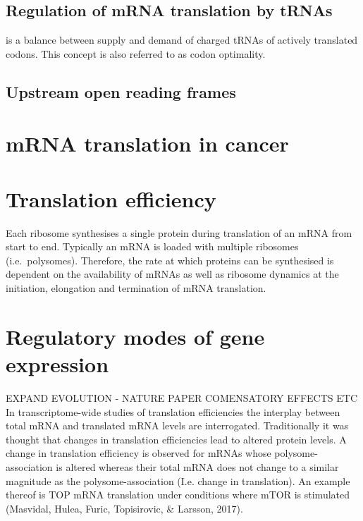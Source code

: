 \documentclass[12pt,openany]{book}
\begin{document}
\subsection{Regulation of mRNA translation by tRNAs} \label{tRNA}

is a balance between supply and demand of charged tRNAs of actively
translated codons. This concept is also referred to as codon optimality.

\subsection{Upstream open reading frames}

\section{mRNA translation in cancer} \label{translationInCancer}

\section{Translation efficiency}

Each ribosome synthesises a single protein during translation of an mRNA
from start to end. Typically an mRNA is loaded with multiple ribosomes
(i.e.~polysomes). Therefore, the rate at which proteins can be
synthesised is dependent on the availability of mRNAs as well as
ribosome dynamics at the initiation, elongation and termination of mRNA
translation.

\section{Regulatory modes of gene expression}

EXPAND EVOLUTION - NATURE PAPER COMENSATORY EFFECTS ETC In
transcriptome-wide studies of translation efficiencies the interplay
between total mRNA and translated mRNA levels are interrogated.
Traditionally it was thought that changes in translation efficiencies
lead to altered protein levels. A change in translation efficiency is
observed for mRNAs whose polysome-association is altered whereas their
total mRNA does not change to a similar magnitude as the
polysome-association (I.e. change in translation). An example thereof is
TOP mRNA translation under conditions where mTOR is stimulated
(Masvidal, Hulea, Furic, Topisirovic, \& Larsson, 2017).
\end{document}
